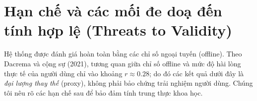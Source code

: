 
\section{Hạn chế và các mối đe doạ đến tính hợp lệ (Threats to Validity)}
\label{sec:threats}

Hệ thống được đánh giá hoàn toàn bằng các chỉ số ngoại tuyến (offline). Theo
Dacrema và cộng sự (2021), tương quan giữa chỉ số offline và mức độ hài lòng thực
tế của người dùng chỉ vào khoảng $r \approx 0.28$; do đó các kết quả dưới đây là
\emph{đại lượng thay thế} (proxy), không phải bảo chứng trải nghiệm người dùng.
Chúng tôi nêu rõ các hạn chế sau để bảo đảm tính trung thực khoa học.

